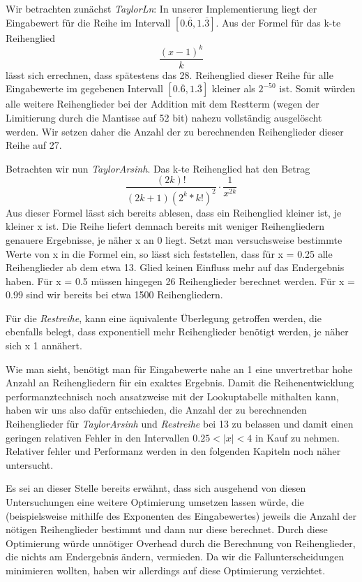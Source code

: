 \documentclass[course=erap] {aspdoc}
\begin{document}
    
    Wir betrachten zunächst \textit{TaylorLn}:
    In unserer Implementierung liegt der Eingabewert für die Reihe im Intervall $[0.\overline{6}, 1.\overline{3}]$. Aus der Formel für das k-te Reihenglied 
    \[ \frac{(x - 1)^k}{k}
    \]
    lässt sich errechnen, dass spätestens das 28. Reihenglied dieser Reihe für alle Eingabewerte im gegebenen Intervall $[0.\overline{6}, 1.\overline{3}]$ kleiner als $2^{-50}$ ist. Somit würden alle weitere Reihenglieder bei der Addition mit dem Restterm (wegen der Limitierung durch die Mantisse auf 52 bit) nahezu vollständig ausgelöscht werden. Wir setzen daher die Anzahl der zu berechnenden Reihenglieder dieser Reihe auf 27.  
    
    Betrachten wir nun \textit{TaylorArsinh}. Das k-te Reihenglied hat den Betrag
    \[
    \frac{(2k)!}{(2k + 1)(2^k*k!)^2}\cdot \frac{1}{x^{2k}}
    \]
    Aus dieser Formel lässt sich bereits ablesen, dass ein Reihenglied kleiner ist, je kleiner x ist. Die Reihe liefert demnach bereits mit weniger Reihengliedern genauere Ergebnisse, je näher x an 0 liegt. Setzt man versuchsweise bestimmte Werte von x in die Formel ein, so lässt sich feststellen, dass für x = 0.25 alle Reihenglieder ab dem etwa 13. Glied keinen Einfluss mehr auf das Endergebnis haben. Für x = 0.5 müssen hingegen 26 Reihenglieder berechnet werden. Für x = 0.99 sind wir bereits bei etwa 1500 Reihengliedern. 
    
    Für die \textit{Restreihe}, kann eine äquivalente Überlegung getroffen werden, die ebenfalls belegt, dass exponentiell mehr Reihenglieder benötigt werden, je näher sich x 1 annähert.
    
    
    Wie man sieht, benötigt man für Eingabewerte nahe an 1 eine unvertretbar hohe Anzahl an Reihengliedern für ein exaktes Ergebnis. Damit die Reihenentwicklung performanztechnisch noch ansatzweise mit der Lookuptabelle mithalten kann, haben wir uns also dafür entschieden, die Anzahl der zu berechnenden Reihenglieder für \textit{TaylorArsinh} und \textit{Restreihe} bei 13 zu belassen und damit einen geringen relativen Fehler in den Intervallen $0.25<|x|<4$ in Kauf zu nehmen. 
    Relativer fehler und Performanz werden in den folgenden Kapiteln noch näher untersucht.
    
    Es sei an dieser Stelle bereits erwähnt, dass sich ausgehend von diesen Untersuchungen eine weitere Optimierung umsetzen lassen würde, die (beispielsweise mithilfe des Exponenten des Eingabewertes) jeweils die Anzahl der nötigen Reihenglieder bestimmt und dann nur diese berechnet. Durch diese Optimierung würde unnötiger Overhead durch die Berechnung von Reihenglieder, die nichts am Endergebnis ändern, vermieden. Da wir die Fallunterscheidungen minimieren wollten, haben wir allerdings auf diese Optimierung verzichtet.
\end{document}
